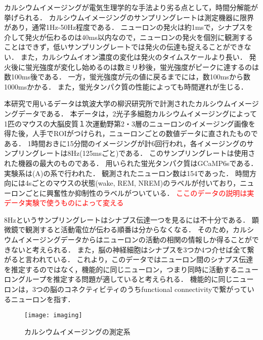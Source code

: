カルシウムイメージングが電気生理学的な手法より劣る点として，時間分解能が挙げられる．
カルシウムイメージングのサンプリングレートは測定機器に限界があり\cite{Nakamura2003}，通常1Hz-50Hz程度である．
ニューロンの発火は約1msで，シナプスを介して発火が伝わるのは40ms以内\cite{Bi1998}なので，ニューロンの発火を個別に観測することはできず，低いサンプリングレートでは発火の伝達も捉えることができない．
また，カルシウムイオン濃度の変化は発火のタイムスケールより長い．
発火後に蛍光強度が変化し始めるのは数ミリ秒後，蛍光強度がピークに達するのは数100ms後である．
一方，蛍光強度が元の値に戻るまでには，数100msから数1000msかかる\cite{Hira2018}．
また，蛍光タンパク質の性能によっても時間遅れが生じる．

本研究で用いるデータは筑波大学の柳沢研究所で計測されたカルシウムイメージングデータである．
本データは，2光子多細胞カルシウムイメージングによって1匹のマウスの大脳皮質１次運動野第2・3層のニューロンのイメージング画像を得た後，人手でROIがつけられ，ニューロンごとの数値データに直されたものである．
1時間おきに15分間のイメージングが計6回行われ，各イメージングのサンプリングレートは8Hz(125msごと)である．
このサンプリングレートは使用された機器の最大のものである．
用いられた蛍光タンパク質はGCaMP6sである．
実験系は(A)の系で行われた\cite{Kanda2016}．
観測されたニューロン数は154であった．
時間方向には4sごとのマウスの状態(wake, REM, NREM)のラベルが付いており，ニューロンごとに興奮性か抑制性のラベルがついている．
\textcolor{red}{ここのデータの説明は実データ実験で使うものによって変える}

8Hzというサンプリングレートはシナプス伝達一つを見るには不十分である．
顕微鏡で観測すると活動電位が伝わる順番は分からなくなる．
そのため，カルシウムイメージングデータからはニューロンの活動の相関の情報しか得ることができないと考えられる．
また，脳の神経細胞はシナプスを3つか4つ介せば全て繋がると言われている．
これより，このデータではニューロン間のシナプス伝達を推定するのではなく，機能的に同じニューロン，つまり同時に活動するニューロングループを推定する問題が適していると考えられる．
機能的に同じニューロンは，3つの脳のコネクティビティのうちfunctional connectivityで繋がっているニューロンを指す．
\begin{figure}[htbp]
    \begin{center}
				\texttt{[image: imaging]}
        \caption{カルシウムイメージングの測定系}
        \label{fig:imaging}
    \end{center}
\end{figure}
